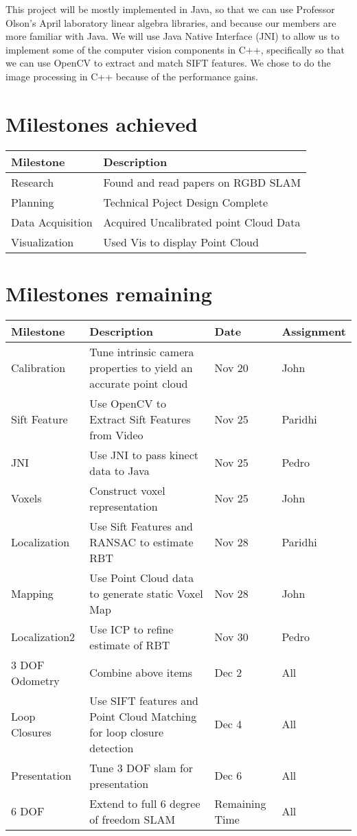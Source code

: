 \documentclass[12pt]{article}
\begin{document}
This project will be mostly implemented in Java, so that we can use Professor Olson's April laboratory linear algebra libraries, and because our members are more familiar with Java.  We will use Java Native Interface (JNI) to allow us to implement some of the computer vision components in C++, specifically so that we can use OpenCV to extract and match SIFT features. We chose to do the image processing in C++ because of the performance gains.

\section{Milestones achieved}
\begin{tabular}{| l | p{9cm} | }
\hline
Milestone & Description \\ \hline
Research & Found and read papers on RGBD SLAM \\ \hline
Planning & Technical Poject Design Complete \\ \hline
Data Acquisition & Acquired Uncalibrated point Cloud Data \\ \hline
Visualization & Used Vis to display Point Cloud \\ \hline

\end{tabular}


\section{Milestones remaining}
\begin{tabular}{|l |p{7cm}| |l| l|}
\hline
Milestone & Description & Date & Assignment \\ \hline
Calibration & Tune intrinsic camera properties to yield an accurate point cloud & Nov 20 & John \\ \hline
Sift Feature & Use OpenCV to Extract Sift  Features from Video & Nov 25 & Paridhi \\ \hline
JNI & Use JNI to pass kinect data to Java & Nov 25 & Pedro \\ \hline
Voxels & Construct voxel representation & Nov 25 & John \\ \hline
Localization & Use Sift Features and RANSAC to  estimate RBT & Nov 28 & Paridhi \\ \hline
Mapping & Use Point Cloud data to generate  static Voxel Map & Nov 28 & John \\ \hline
Localization2 & Use ICP to refine estimate of RBT & Nov 30 & Pedro \\ \hline
3 DOF Odometry & Combine above items & Dec 2 & All \\ \hline
Loop Closures & Use SIFT features and Point Cloud  Matching for loop closure detection & Dec 4 & All \\ \hline
Presentation & Tune 3 DOF slam for presentation & Dec 6 & All \\ \hline
6 DOF & Extend to full 6 degree of freedom SLAM & Remaining Time & All \\ \hline
\end{tabular}
\end{document}
